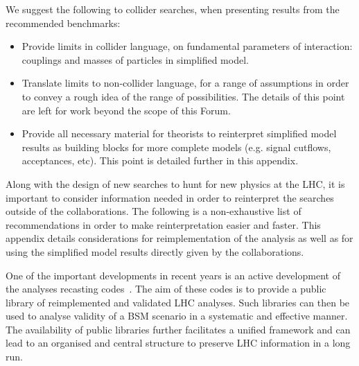 
 We suggest the following to collider searches, when presenting results 
 from the recommended benchmarks: 
 \begin{itemize}
 \item Provide limits in collider language, on fundamental parameters of
 interaction: couplings and masses of particles in simplified model.
 \item Translate limits to non-collider language, for a range of
 assumptions in order to convey a rough idea of the range of
 possibilities. The details of this point are left for work beyond the scope of this Forum. 
 \item Provide all necessary material for theorists to reinterpret simplified
 model results as building blocks for more complete models (e.g. signal cutflows,
 acceptances, etc). This point is detailed further in this appendix.
 \end{itemize}

Along with the design of new searches to hunt for new physics at the LHC, it is important to consider information needed in order to reinterpret the searches outside of the collaborations. The following is a non-exhaustive list of recommendations in order to make reinterpretation easier and faster. This appendix details considerations for reimplementation of the analysis as well as for using the simplified model results directly given by the collaborations. 

One of the important developments in recent years is an active development of the analyses recasting codes~\cite{Dumont:2014tja, Conte:2014zja, Kim:2015wza}. The aim of these codes is to provide a public library of reimplemented and validated LHC analyses. Such libraries can then be used to analyse validity of a BSM scenario in a systematic and effective manner. The availability of public libraries further facilitates a unified framework and can lead to an organised and central structure to preserve LHC information in a long run. 

